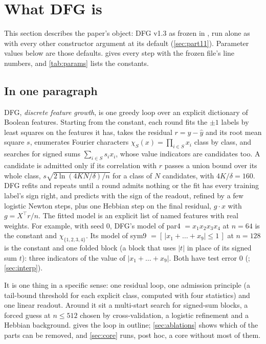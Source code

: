 \section{What DFG is}\label{sec:learner}

This section describes the paper's object: DFG v1.3 as frozen in , run alone as  with every other constructor argument at its default (\cref{sec:part11}). Parameter values below are those defaults.  gives every step with the frozen file's line numbers, and \cref{tab:params} lists the constants.

\subsection{In one paragraph}\label{sec:oneline}

DFG, \emph{discrete feature growth}, is one greedy loop over an explicit dictionary of Boolean features. Starting from the constant, each round fits the $\pm1$ labels by least squares on the features it has, takes the residual $r=y-\hat y$ and its root mean square $s$, enumerates Fourier characters $\chi_S(x)=\prod_{i\in S}x_i$ class by class, and searches for signed sums $\sum_{i\in S}s_ix_i$, whose value indicators are candidates too. A candidate is admitted only if its correlation with $r$ passes a union bound over its whole class, $s\sqrt{2\ln(4KN/\delta)/n}$ for a class of $N$ candidates, with $4K/\delta=160$. DFG refits and repeats until a round admits nothing or the fit has every training label's sign right, and predicts with the sign of the readout, refined by a few logistic Newton steps, plus one Hebbian step on the final residual, $g\cdot x$ with $g=X^\top r/n$. The fitted model is an explicit list of named features with real weights. For example, with seed 0, DFG's model of par4 $=x_1x_2x_3x_4$ at $n=64$ is the constant and $\chi_{\{1,2,3,4\}}$. Its model of sym9 $=[\,|x_1+\dots+x_9|\le1\,]$ at $n=128$ is the constant and one folded block (a block that uses $|t|$ in place of its signed sum $t$): three indicators of the value of $|x_1+\dots+x_9|$. Both have test error 0 (; \cref{sec:interp}).

It is one thing in a specific sense: one residual loop, one admission principle (a tail-bound threshold for each explicit class, computed with four statistics) and one linear readout. Around it sit a multi-start search for signed-sum blocks, a forced guess at $n\le512$ chosen by cross-validation, a logistic refinement and a Hebbian background.  gives the loop in outline; \cref{sec:ablations} shows which of the parts can be removed, and \cref{sec:core} runs, post hoc, a core without most of them.

